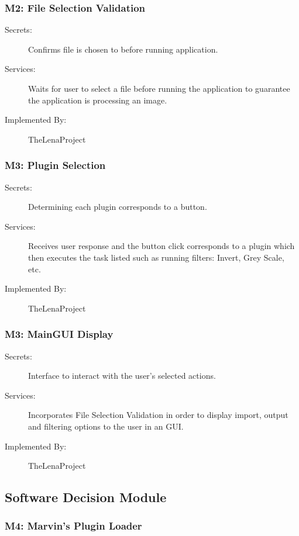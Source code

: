 \documentclass[12pt, titlepage]{article}
\begin{document}
\subsubsection{M2: File Selection Validation}

\begin{description}
	\item[Secrets:]  Confirms file is chosen to before running application.
	\item[Services:] Waits for user to select a file before running the application to guarantee the application is processing an image.
	\item[Implemented By:] TheLenaProject
\end{description}

\subsubsection{M3: Plugin Selection}

\begin{description}
	\item[Secrets:] Determining each plugin corresponds to a button.
	\item[Services:] Receives user response and the button click corresponds to a plugin which then executes the task listed such as running filters: Invert, Grey Scale, etc. 
	\item[Implemented By:] TheLenaProject
\end{description}

\subsubsection{M3: MainGUI Display}

\begin{description}
	\item[Secrets:] Interface to interact with the user's selected actions.
	\item[Services:] Incorporates File Selection Validation in order to display import, output and filtering options to the user in an GUI.
	\item[Implemented By:] TheLenaProject
\end{description}

\subsection{Software Decision Module}

\subsubsection{M4: Marvin's Plugin Loader}
\end{document}
